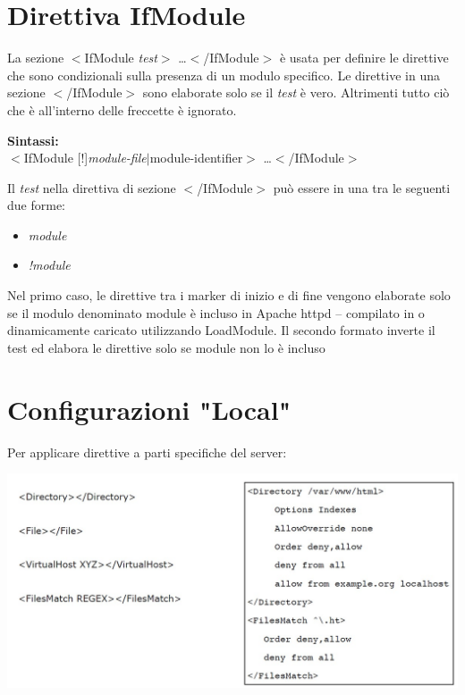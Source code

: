 \section{Direttiva IfModule}
La sezione $<$IfModule \emph{test}$>$ \dots $<$/IfModule$>$ è usata per definire le direttive che sono condizionali sulla presenza di un modulo specifico. Le direttive in una sezione $<$/IfModule$>$ sono elaborate solo se il \emph{test} è vero. Altrimenti tutto ciò che è all'interno delle freccette è ignorato.\\
\begin{center}
    \textbf{Sintassi:}\\
    $<$IfModule [!]\emph{module-file}$|$module-identifier$>$ \dots $<$/IfModule$>$ 
\end{center}
Il \emph{test} nella direttiva di sezione $<$/IfModule$>$ può essere in una tra le seguenti due forme:
\begin{itemize}
    \item \emph{module}
    \item \emph{!module}
\end{itemize}
Nel primo caso, le direttive tra i marker di inizio e di fine vengono elaborate solo se il modulo denominato module è incluso in Apache httpd -- compilato in o dinamicamente
caricato utilizzando LoadModule.
Il secondo formato inverte il test ed elabora le direttive solo se module non lo è incluso

\section{Configurazioni "Local"}
Per applicare direttive a parti specifiche del server:
\begin{center}
\includegraphics[scale=0.4]{Images/TecnologieWeb/2/ConfigurazioneLocale.jpg}  
\end{center}


